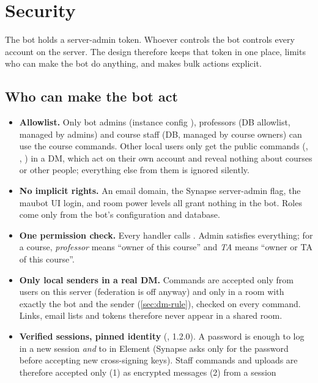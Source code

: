 \chapter{Security}
\label{ch:security}

The bot holds a server-admin token. Whoever controls the bot controls every account on the
server. The design therefore keeps that token in one place, limits who can make the bot do
anything, and makes bulk actions explicit.

\section{Who can make the bot act}

\begin{itemize}
  \item \textbf{Allowlist.} Only bot admins (instance config ), professors (DB
        allowlist, managed by admins) and course staff (DB, managed by course owners) can use
        the course commands. Other local users only get the public commands (,
        , ) in a DM, which act on their own account and
        reveal nothing about courses or other people; everything else from them is ignored
        silently.
  \item \textbf{No implicit rights.} An email domain, the Synapse server-admin flag, the maubot
        UI login, and room power levels all grant nothing in the bot. Roles come only from
        the bot's configuration and database.
  \item \textbf{One permission check.} Every handler calls .
        Admin satisfies everything; for a course, \emph{professor} means \enquote{owner of
        this course} and \emph{TA} means \enquote{owner or TA of this course}.
  \item \textbf{Only local senders in a real DM.} Commands are accepted only from users on this
        server (federation is off anyway) and only in a room with exactly the bot and the
        sender (\autoref{sec:dm-rule}), checked on every command. Links, email lists and
        tokens therefore never appear in a shared room.
  \item \textbf{Verified sessions, pinned identity} (, 1.2.0). A password is
        enough to log in a new session \emph{and} to  in Element (Synapse
        asks only for the password before accepting new cross-signing keys). Staff commands
        and uploads are therefore accepted only (1) as encrypted messages (2) from a session

\end{itemize}
